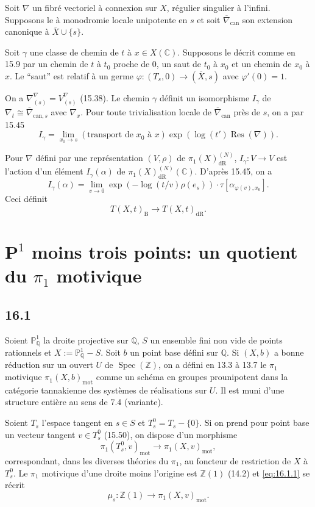\documentclass[12pt,a4paper]{article}
\theoremstyle{plain}
\theoremstyle{definition}
\theoremstyle{remark}
\DeclareMathOperator{\Spec}{Spec}
\DeclareMathOperator{\Res}{Res}
\newcommand{\bZ}{\mathbb{Z}}
\newcommand{\bQ}{\mathbb{Q}}
\newcommand{\bC}{\mathbb{C}}
\newcommand{\bP}{\mathbb{P}}
\newcommand{\dr}{\mathrm{dR}}
\newcommand{\B}{\mathrm{B}}
\newcommand{\mot}{\mathrm{mot}}
\begin{document}
Soit $\nabla$ un fibré vectoriel à connexion sur $X$, régulier singulier à l'infini. Supposons le à monodromie locale unipotente en $s$ et soit $\overline{\nabla}_{\text{can}}$ son extension canonique à $\overline{X} \cup \{s\}$.

Soit $\gamma$ une classe de chemin de $t$ à $x \in X(\bC)$. Supposons le décrit comme en 15.9 par un chemin de $t$ à $t_0$ proche de $0$, un saut de $t_0$ à $x_0$ et un chemin de $x_0$ à $x$. Le ``saut'' est relatif à un germe $\varphi: (T_s, 0) \to (\overline{X}, s)$ avec $\varphi'(0) = 1$.

On a $\nabla_{(s)}^\nabla = V^\nabla_{(s)}$ (15.38). Le chemin $\gamma$ définit un isomorphisme $I_\gamma$ de $\nabla_t \cong \overline{\nabla}_{\text{can}, s}$ avec $\nabla_x$. Pour toute trivialisation locale de $\overline{\nabla}_{\text{can}}$ près de $s$, on a par 15.45
\[
I_\gamma = \lim_{x_0 \to s} (\text{transport de } x_0 \text{ à } x) \exp(\log(t') \Res(\nabla)).
\]

Pour $\nabla$ défini par une représentation $(V, \rho)$ de $\pi_1(X)_{\dr}^{(N)}$, $I_\gamma: V \to V$ est l'action d'un élément $I_\gamma(\alpha)$ de $\pi_1(X)_{\dr}^{(N)}(\bC)$. D'après 15.45, on a
\[
I_\gamma(\alpha) = \lim_{v \to 0} \exp(-\log(t/v) \rho(e_s)) \cdot \tau[\alpha_{\varphi(v), x_0}].
\]
Ceci définit
\[
T(X, t)_{\B} \to T(X, t)_{\dr}.
\]


\section{$\mathbf{P}^1$ moins trois points: un quotient du $\pi_1$ motivique}\label{sec:16}

\subsection*{16.1}

Soient $\bP^1_{\bQ}$ la droite projective sur $\bQ$, $S$ un ensemble fini non vide de points rationnels et $X := \bP^1_{\bQ} - S$. Soit $b$ un point base défini sur $\bQ$. Si $(X, b)$ a bonne réduction sur un ouvert $U$ de $\Spec(\bZ)$, on a défini en 13.3 à 13.7 le $\pi_1$ motivique $\pi_1(X, b)_{\mot}$ comme un schéma en groupes prounipotent dans la catégorie tannakienne des systèmes de réalisations sur $U$. Il est muni d'une structure entière au sens de 7.4 (variante).

Soient $T_s$ l'espace tangent en $s \in S$ et $T_s^0 = T_s - \{0\}$. Si on prend pour point base un vecteur tangent $v \in T_s^0$ (15.50), on dispose d'un morphisme
\begin{equation}\label{eq:16.1.1}
\pi_1(T_s^0, v)_{\mot} \to \pi_1(X, v)_{\mot},
\end{equation}
correspondant, dans les diverses théories du $\pi_1$, au foncteur de restriction de $X$ à $T_s^0$. Le $\pi_1$ motivique d'une droite moins l'origine est $\bZ(1)$ (14.2) et \eqref{eq:16.1.1} se récrit
\begin{equation}\label{eq:16.1.2}
\mu_s: \bZ(1) \to \pi_1(X, v)_{\mot}.
\end{equation}
\end{document}
